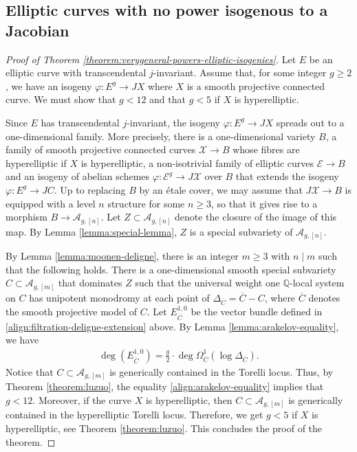 \documentclass[a4paper,11pt,reqno]{amsart}
\numberwithin{equation}{section}
\theoremstyle{plain}
\theoremstyle{definition}
\newcommand{\Q}{\mathbb Q}
\newcommand{\ol}[1]{{\overline{#1}}}
\newcommand{\ca}[1]{{\mathcal{#1}}}
\begin{document}
\subsection{Elliptic curves with no power isogenous to a Jacobian}  

\begin{proof}[Proof of Theorem \ref{theorem:verygeneral-powers-elliptic-isogenies}]
Let $E$ be an elliptic curve with transcendental $j$-invariant. Assume that, for some integer $g \geq 2$, we have an isogeny $\varphi \colon E^g \to JX$ where $X$ is a smooth projective connected curve. We must show that $g < 12$ and that $g < 5$ if $X$ is hyperelliptic. 

Since $E$ has transcendental $j$-invariant, the isogeny $\varphi \colon E^g \to JX$ spreads out to a one-dimensional family. More precisely, there is a one-dimensional variety $B$, a family of smooth projective connected curves $\ca X \to B$ whose fibres are hyperelliptic if $X$ is hyperelliptic, a non-isotrivial family of elliptic curves $\ca E \to B$ and an isogeny of abelian schemes $\varphi \colon \ca E^g \to J\ca X$ over $B$  that extends the isogeny $\varphi \colon E^g \to JC$. 
Up to replacing $B$ by an \'etale cover, we may assume that $J \ca X \to B$ is equipped with a level $n$ structure for some $n \geq 3$, so that it gives rise to a morphism $B \to \ca A_{g,[n]}$. Let $Z \subset \ca A_{g,[n]}$ denote the closure of the image of this map.  
By Lemma \ref{lemma:special-lemma}, $Z$ is a special subvariety of $\ca A_{g,[n]}$. 

By Lemma \ref{lemma:moonen-deligne}, there is an integer $m \geq 3$ with $n \mid m$ such that the following holds.
There is a one-dimensional smooth special subvariety $C \subset \ca A_{g,[m]}$ 
that dominates $Z$
such that the universal weight one $\Q$-local system on $C$ has unipotent monodromy at each point of $\Delta_{\ol C} = \ol C - C$, where $\ol C$ denotes the smooth projective model of $C$. 
Let $E^{1,0}_{\ol C}$ be the vector bundle defined in \eqref{align:filtration-deligne-extension} above. 
By Lemma \ref{lemma:arakelov-equality}, we have 
\begin{align} \label{align:arakelov-equality}
\deg(E^{1,0}_{\ol C}) = \frac{g}{2} \cdot \deg \Omega^1_{\ol C}(\log \Delta_{\ol C}).
\end{align}
Notice that $C \subset \ca A_{g,[m]}$ is generically contained in the Torelli locus. Thus, by Theorem \ref{theorem:luzuo}, the equality \eqref{align:arakelov-equality} implies that $g < 12$. Moreover, if the curve $X$ is hyperelliptic, then $C \subset \ca A_{g,[m]}$ is generically contained in the hyperelliptic Torelli locus. Therefore, we get $g < 5$ if $X$ is hyperelliptic, see Theorem \ref{theorem:luzuo}. This concludes the proof of the theorem.
\end{proof}

\printbibliography
\end{document}
